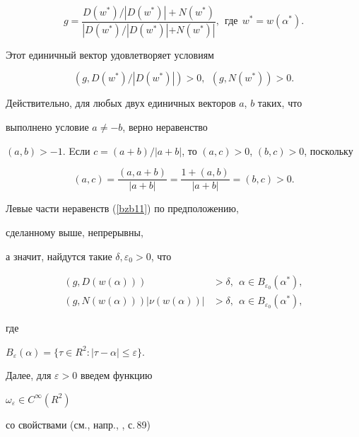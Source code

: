 $$


g=\frac {D(w^*) / |D(w^*)|+N(w^*)}


{|D(w^*) / |D(w^*)|+N(w^*)|},\ \ \text{где}\ \ w^*=w(\alpha^*).


$$


Этот единичный вектор удовлетворяет условиям


\begin{equation} 


(g, D(w^*) / |D(w^*) | ) > 0,\ \ (g, N(w^*) ) > 0.


\label{bzb11}


\end{equation}


Действительно, для любых двух единичных векторов $a$, $b$ таких, что 


выполнено условие $a \neq - b$, верно неравенство


$(a,b)>-1$. Eсли $c=(a+b)/|a+b|$, то $(a,c)>0$, $(b,c)>0$, поскольку


$$


(a, c)=\frac {(a, a+b)} {|a+b|}=\frac {1+(a, b)} {|a+b|}=(b, c) > 0 . 


$$ 


Левые части неравенств (\ref{bzb11}) по предположению, 


сделанному выше, непрерывны, 


а значит, найдутся такие $\delta, \varepsilon_0 > 0$, что


\begin{align} 


(g, D(w(\alpha)) ) &> \delta,\ \ \alpha \in B_{\varepsilon_0} (\alpha ^*), 


\label{bzb12} \\


%


( g, N(w(\alpha )) )|\nu (w(\alpha ))| &>


\delta,\ \ \alpha \in B_{\varepsilon_0} (\alpha ^*),


\label{bzb13}


\end{align}


где


$B_{\varepsilon}(\alpha)=\{\tau\in R^2: |\tau-\alpha|\leq\varepsilon \}$.


Далее, для ${\varepsilon > 0}$ введем функцию 


$\omega_{\varepsilon} \in C^{\infty} (R^2)$


со свойствами (см., напр., \cite{Vlad_1988}, с.\,89)


